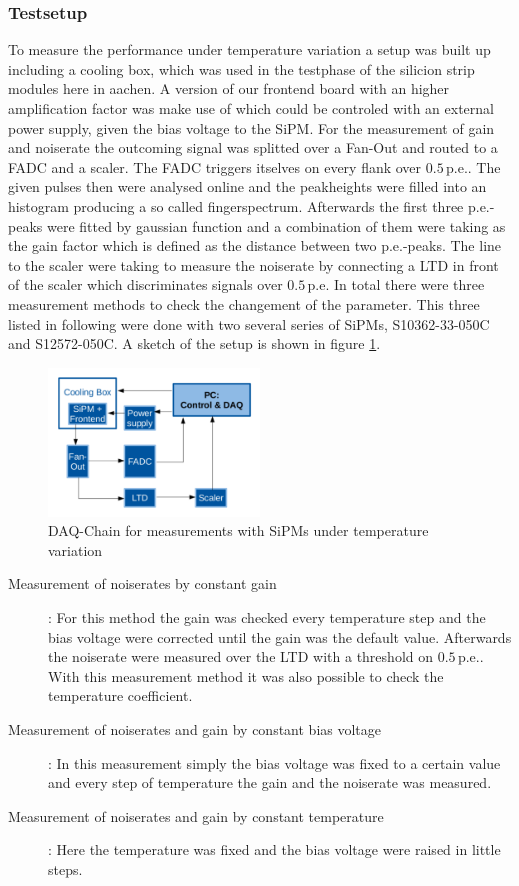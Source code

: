 \subsubsection{Testsetup}
To measure the performance under temperature variation a setup was built up including a cooling box, which was used in the testphase of the silicion strip modules here in aachen.
A version of our frontend board with an higher amplification factor was make use of which could be controled with an external power supply, given the bias voltage to the SiPM. For the measurement of gain and noiserate the outcoming signal was splitted over a Fan-Out and routed to a FADC and a scaler.
The FADC triggers itselves on every flank over $0.5\,\mathrm{p.e.}$. The given pulses then were analysed online and the peakheights were filled into an histogram producing a so called fingerspectrum.
Afterwards the first three p.e.-peaks were fitted by gaussian function and a combination of them were taking as the gain factor which is defined as the distance between two p.e.-peaks.
The line to the scaler were taking to measure the noiserate by connecting a LTD in front of the scaler which discriminates signals over $0.5\,\mathrm{p.e}$.
In total there were three measurement methods to check the changement of the parameter. This three listed in following were done with two several series of SiPMs, S10362-33-050C and S12572-050C.
A sketch of the setup is shown in figure \ref{NoRa_DAQ}. 
\begin{figure}[h]
	\centering
	\includegraphics[width = 0.5\textwidth]{Figures/radermacher/NoRa_DAQ_en.pdf}
	\caption{DAQ-Chain for measurements with SiPMs under temperature variation}
	\label{NoRa_DAQ}
\end{figure}
\begin{description}
	\item[Measurement of noiserates by constant gain]: For this method the gain was checked every temperature step and the bias voltage were corrected until the gain was the default value. Afterwards the noiserate were measured over the LTD with a threshold on $0.5\,\mathrm{p.e.}$. With this measurement method it was also possible to check the temperature coefficient.
	\item[Measurement of noiserates and gain by constant bias voltage]: In this measurement simply the bias voltage was fixed to a certain value and every step of temperature the gain and the noiserate was measured.
	\item[Measurement of noiserates and gain by constant temperature]: Here the temperature was fixed and the bias voltage were raised in little steps. 
\end{description}

